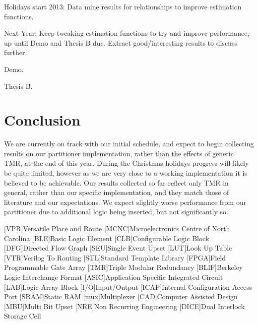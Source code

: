 \documentclass[12pt,drafta4paper,oneside]{memoir} %
\begin{document}
Holidays start 2013: Data mine results for relationships to improve estimation functions.

Next Year: Keep tweaking estimation functions to try and improve performance, up until Demo and Thesis B due. Extract good/interesting results to discuss further.

Demo.

Thesis B.
\chapter{Conclusion}
We are currently on track with our initial schedule, and expect to begin collecting results on our partitioner implementation, rather than the effects of generic \ac{TMR}, at the end of this year. During the Christmas holidays progress will likely be quite limited, however as we are very close to a working implementation it is believed to be achievable.
Our results collected so far reflect only \ac{TMR} in general, rather than our specific implementation, and they match those of literature and our expectations. We expect slightly worse performance from our partitioner due to additional logic being inserted, but not significantly so.

\begin{acronym}
[VPR]{Versatile Place and Route}
[MCNC]{Microelectronics Centre of North Carolina}
[BLE]{Basic Logic Element}
[CLB]{Configurable Logic Block}
[DFG]{Directed Flow Graph}
[SEU]{Single Event Upset}
[LUT]{Look Up Table}
[VTR]{Verilog To Routing}
[STL]{Standard Template Library}
[FPGA]{Field Programmable Gate Array}
[TMR]{Triple Modular Redundancy}
[BLIF]{Berkeley Logic Interchange Format}
[ASIC]{Application Specific Integrated Circuit}
[LAB]{Logic Array Block}
[I/O]{Input/Output}
[ICAP]{Internal Configuration Access Port}
[SRAM]{Static RAM}
[mux]{Multiplexer}
[CAD]{Computer Assisted Design}
[MBU]{Multi Bit Upset}
[NRE]{Non Recurring Engineering}
[DICE]{Dual Interlock Storage Cell}
\end{acronym}



\end{document}
